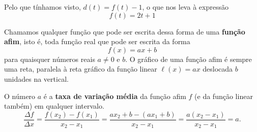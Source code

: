 Pelo que tínhamos visto, $ d(t)=f(t)-1 $, o que nos leva à expressão
\[
f(t)=2t+1
\]

\begin{observation}{}
Chamamos qualquer função que pode ser escrita dessa forma de uma \textbf{função afim}, isto é, toda função real que pode ser escrita da forma
\[
f(x)=ax+b
\]
para quaisquer números reais $ a\neq 0 $ e $ b$. O gráfico de uma função afim é sempre uma reta, paralela à reta gráfico da função linear $ \ell(x)=ax $ deslocada $b$ unidades na vertical.

O número $ a $ é a \textbf{taxa de variação média} da função afim $ f $ (e da função linear também) em qualquer intervalo.
\[
\dfrac{\Delta f}{\Delta x}= \dfrac{f(x_2)-f(x_1)}{x_2-x_1}= \dfrac{ax_2+b-(ax_1+b)}{x_2-x_1}= \dfrac{a(x_2-x_1)}{x_2-x_1}=a.
\]


\begin{figure}[H]
\centering


\end{figure}

\end{observation}

